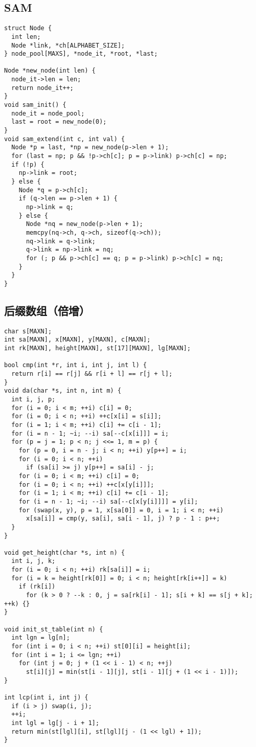 \documentclass[twoside]{article}
\begin{document}
\subsection{SAM}
\begin{lstlisting}
struct Node {
  int len;
  Node *link, *ch[ALPHABET_SIZE];
} node_pool[MAXS], *node_it, *root, *last;

Node *new_node(int len) {
  node_it->len = len;
  return node_it++;
}
void sam_init() {
  node_it = node_pool;
  last = root = new_node(0);
}
void sam_extend(int c, int val) {
  Node *p = last, *np = new_node(p->len + 1);
  for (last = np; p && !p->ch[c]; p = p->link) p->ch[c] = np;
  if (!p) {
    np->link = root;
  } else {
    Node *q = p->ch[c];
    if (q->len == p->len + 1) {
      np->link = q;
    } else {
      Node *nq = new_node(p->len + 1);
      memcpy(nq->ch, q->ch, sizeof(q->ch));
      nq->link = q->link;
      q->link = np->link = nq;
      for (; p && p->ch[c] == q; p = p->link) p->ch[c] = nq;
    }
  }
}

\end{lstlisting}
\subsection{后缀数组（倍增）}
\begin{lstlisting}
char s[MAXN];
int sa[MAXN], x[MAXN], y[MAXN], c[MAXN];
int rk[MAXN], height[MAXN], st[17][MAXN], lg[MAXN];

bool cmp(int *r, int i, int j, int l) {
  return r[i] == r[j] && r[i + l] == r[j + l];
}
void da(char *s, int n, int m) {
  int i, j, p;
  for (i = 0; i < m; ++i) c[i] = 0;
  for (i = 0; i < n; ++i) ++c[x[i] = s[i]];
  for (i = 1; i < m; ++i) c[i] += c[i - 1];
  for (i = n - 1; ~i; --i) sa[--c[x[i]]] = i;
  for (p = j = 1; p < n; j <<= 1, m = p) {
    for (p = 0, i = n - j; i < n; ++i) y[p++] = i;
    for (i = 0; i < n; ++i)
      if (sa[i] >= j) y[p++] = sa[i] - j;
    for (i = 0; i < m; ++i) c[i] = 0;
    for (i = 0; i < n; ++i) ++c[x[y[i]]];
    for (i = 1; i < m; ++i) c[i] += c[i - 1];
    for (i = n - 1; ~i; --i) sa[--c[x[y[i]]]] = y[i];
    for (swap(x, y), p = 1, x[sa[0]] = 0, i = 1; i < n; ++i)
      x[sa[i]] = cmp(y, sa[i], sa[i - 1], j) ? p - 1 : p++;
  }
}

void get_height(char *s, int n) {
  int i, j, k;
  for (i = 0; i < n; ++i) rk[sa[i]] = i;
  for (i = k = height[rk[0]] = 0; i < n; height[rk[i++]] = k)
    if (rk[i])
      for (k > 0 ? --k : 0, j = sa[rk[i] - 1]; s[i + k] == s[j + k]; ++k) {}
}

void init_st_table(int n) {
  int lgn = lg[n];
  for (int i = 0; i < n; ++i) st[0][i] = height[i];
  for (int i = 1; i <= lgn; ++i)
    for (int j = 0; j + (1 << i - 1) < n; ++j)
      st[i][j] = min(st[i - 1][j], st[i - 1][j + (1 << i - 1)]);
}

int lcp(int i, int j) {
  if (i > j) swap(i, j);
  ++i;
  int lgl = lg[j - i + 1];
  return min(st[lgl][i], st[lgl][j - (1 << lgl) + 1]);
}

\end{lstlisting}
\end{document}
